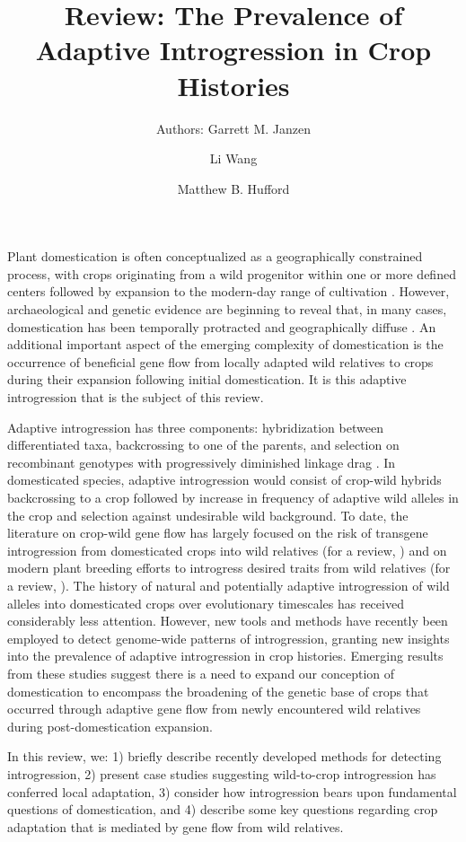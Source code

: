 \documentclass[11pt]{article}
\title{Review: The Prevalence of Adaptive Introgression in Crop Histories}
\author[1]{Authors: Garrett M. Janzen}%
\author[1]{Li Wang}
\author[1,*]{Matthew B. Hufford}
\affil[1]{Department of Ecology, Evolution, and Organismal Biology, Iowa State University, Ames, Iowa, USA}
\affil[*]{Correspondence: mhufford@iastate.edu (M.B. Hufford)}
\date{}
\begin{document}
\maketitle

Plant domestication is often conceptualized as a geographically constrained process, with crops originating from a wild progenitor within one or more defined centers followed by expansion to the modern-day range of cultivation \cite{Harlan1992}.
However, archaeological and genetic evidence are beginning to reveal that, in many cases, domestication has been temporally protracted and geographically diffuse \cite{Meyer2016, Wang2017, Fuller2014}.
An additional important aspect of the emerging complexity of domestication is the occurrence of beneficial gene flow from locally adapted wild relatives to crops during their expansion following initial domestication.
It is this adaptive introgression that is the subject of this review.

Adaptive introgression has three components: hybridization between differentiated taxa, backcrossing to one of the parents, and selection on recombinant genotypes with progressively diminished linkage drag \cite{barton2001role}.
In domesticated species, adaptive introgression would consist of crop-wild hybrids backcrossing to a crop followed by increase in frequency of adaptive wild alleles in the crop and selection against undesirable wild background.
To date, the literature on crop-wild gene flow has largely focused on the risk of transgene introgression from domesticated crops into wild relatives (for a review, \cite{stewart2003transgene}) and on modern plant breeding efforts to introgress desired traits from wild relatives (for a review, \cite{Dempewolf2017}).
The history of natural and potentially adaptive introgression of wild alleles into domesticated crops over evolutionary timescales has received considerably less attention.
However, new tools and methods have recently been employed to detect genome-wide patterns of introgression, granting new insights into the prevalence of adaptive introgression in crop histories.
Emerging results from these studies suggest there is a need to expand our conception of domestication to encompass the broadening of the genetic base of crops that occurred through adaptive gene flow from newly encountered wild relatives during post-domestication expansion.

In this review, we: 1) briefly describe recently developed methods for detecting introgression, 2) present case studies suggesting wild-to-crop introgression has conferred local adaptation, 3) consider how introgression bears upon fundamental questions of domestication, and 4) describe some key questions regarding crop adaptation that is mediated by gene flow from wild relatives.
\end{document}
